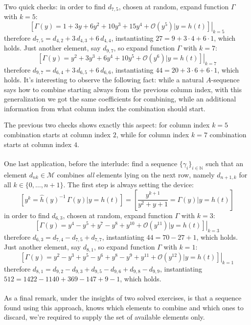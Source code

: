 Two quick checks: in order to find $d_{7,5}$, chosen at random, 
expand function $\Gamma$ with $k=5$:
\begin{displaymath}
    \left.\left[\Gamma(y)=1 + 3y + 6y^2 + 10y^3 + 15y^4 + \mathcal{O}(y^5) 
        \big| y = h(t) \right]\right|_{k=5}
\end{displaymath}
therefore $d_{7,5}=d_{4,2} + 3\,d_{4,3} + 6\,d_{4,4}$, 
instantiating $27 = 9 + 3\cdot4 + 6\cdot1$, which holds.
Just another element, say $d_{9,7}$, so expand function $\Gamma$ with $k=7$:
\begin{displaymath}
    \left.\left[\Gamma(y)=y^2 + 3y^3 + 6y^4 + 10y^5 +  \mathcal{O}(y^6) 
        \big| y = h(t) \right]\right|_{k=7}
\end{displaymath}
therefore $d_{9,7}=d_{6,4} + 3\,d_{6,5} + 6\,d_{6,6}$, 
instantiating $44 = 20 + 3\cdot6 + 6\cdot1$, which holds.
It's interesting to observe the following fact: while a natural $A$-sequence
says how to combine starting always from the previous column index, with
this generalization we got the same coefficients for combining, while
an additional information from what column index the combination should start.

The previous two checks shows exactly this aspect: for column index $k=5$
combination starts at column index $2$, while for column index $k=7$ combination
starts at column index $4$.
\\\\
One last application, before the interlude: 
find a sequence $\lbrace \gamma_{i} \rbrace_{i\in\mathbb{N}}$ such that 
an element $d_{nk}\in\mathcal{M}$ combines \emph{all} elements lying on 
the next row, namely $d_{n+1,k}$ for all $k\in\lbrace0,\ldots,n+1\rbrace$.
The first step is always setting the device:
\begin{displaymath}
    \left[y^{k} = \hat{h}(y)^{-1}\,\Gamma(y) \big| y = h(t) \right]=
        \left[ \frac{y^{k + 1}}{y^2 + y + 1} = \Gamma(y) \big| y = h(t) \right]
\end{displaymath}
in order to find $d_{6,3}$, chosen at random, expand function $\Gamma$ with $k=3$:
\begin{displaymath}
    \left.\left[\Gamma(y)=y^4 -y^5 + y^7 -y^8 +y^{10} + \mathcal{O}(y^{11}) 
        \big| y = h(t) \right]\right|_{k=3}
\end{displaymath}
therefore $d_{6,3}=d_{7,4} - d_{7,5} + d_{7,7}$, instantiating $44 = 70 -27 +1$, 
which holds. Just another element, say $d_{8,1}$, so expand function 
$\Gamma$ with $k=1$:
\begin{displaymath}
    \left.\left[\Gamma(y)=y^2 -y^3 + y^5 -y^6 + y^8 -y^9 + y^{11} + 
        \mathcal{O}(y^{12}) \big| y = h(t) \right]\right|_{k=1}
\end{displaymath}
therefore $d_{8,1}=d_{9,2} - d_{9,3} + d_{9,5}- d_{9,6}+ d_{9,8}- d_{9,9}$, 
instantiating $512 = 1422 -1140 +369 -147 +9 -1$, which holds.
\\\\
As a final remark, under the insights of two solved exercises, is that a
sequence found using this approach, knows which elements to combine and which
ones to discard, we're required to supply the set of available elements only.


